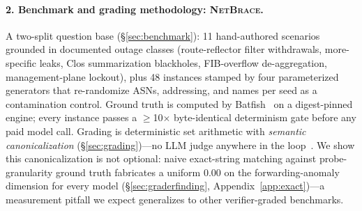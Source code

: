 \documentclass[11pt]{article}
\newcommand{\netbrace}{\textsc{NetBrace}}
\begin{document}
\paragraph{2. Benchmark and grading methodology: \netbrace{}.} A two-split
question base (\S\ref{sec:benchmark}): 11 hand-authored scenarios grounded in
documented outage classes (route-reflector filter withdrawals, more-specific
leaks, Clos summarization blackholes, FIB-overflow de-aggregation,
management-plane lockout), plus 48 instances stamped by four parameterized
generators that re-randomize ASNs, addressing, and names per seed as a
contamination control. Ground truth is computed by Batfish~\cite{batfish} on
a digest-pinned engine; every instance passes a $\geq$10$\times$
byte-identical determinism gate before any paid model call. Grading is
deterministic set arithmetic with \emph{semantic canonicalization}
(\S\ref{sec:grading})---no LLM judge anywhere in the loop~\cite{abc}. We
show this canonicalization is not optional: naive exact-string matching
against probe-granularity ground truth fabricates a uniform 0.00 on the
forwarding-anomaly dimension for every model
(\S\ref{sec:graderfinding}, Appendix~\ref{app:exact})---a measurement
pitfall we expect generalizes to other verifier-graded benchmarks.
\end{document}
